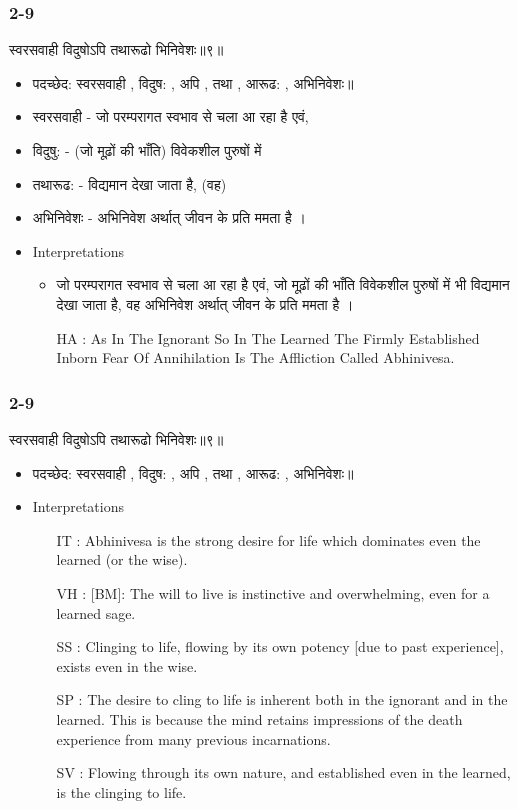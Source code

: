 \begin{frame}[fragile]\frametitle{2-9}
\begin{sanskrit}
स्वरसवाही विदुषोऽपि तथारूढो भिनिवेशः॥९॥
\end{sanskrit}

	\begin{itemize}
	\item पदच्छेद: स्वरसवाही , विदुष: , अपि , तथा , आरूढ: , अभिनिवेशः॥
	\item स्वरसवाही - जो परम्परागत स्वभाव से चला आ रहा है एवं,
	\item विदुषु: - (जो मूढ़ों की भाँति) विवेकशील पुरुषों में
	\item तथारूढ: - विद्यमान देखा जाता है, (वह)
	\item अभिनिवेशः - अभिनिवेश अर्थात् जीवन के प्रति ममता है ।	
	\item Interpretations
		\begin{itemize}
		\item जो परम्परागत स्वभाव से चला आ रहा है एवं, जो मूढ़ों की भाँति विवेकशील पुरुषों में भी विद्यमान देखा जाता है, वह अभिनिवेश अर्थात् जीवन के प्रति ममता है ।
		\item [HA]: As In The Ignorant So In The Learned The Firmly Established Inborn Fear Of Annihilation Is The Affliction Called Abhinivesa.
		\end{itemize}
	\end{itemize}

\end{frame}

\begin{frame}[fragile]\frametitle{2-9}
\begin{sanskrit}
स्वरसवाही विदुषोऽपि तथारूढो भिनिवेशः॥९॥
\end{sanskrit}

	\begin{itemize}
	\item पदच्छेद: स्वरसवाही , विदुष: , अपि , तथा , आरूढ: , अभिनिवेशः॥
	\item Interpretations
		\begin{itemize}
		\item [IT]: Abhinivesa is the strong desire for life which dominates even the learned (or the wise).
		\item [VH]: [BM]: The will to live is instinctive and overwhelming, even for a learned sage.
		\item [SS]: Clinging to life, flowing by its own potency [due to past experience], exists even in the wise.
		\item [SP]: The desire to cling to life is inherent both in the ignorant and in the learned. This is because the mind retains impressions of the death experience from many previous incarnations.
		\item [SV]: Flowing through its own nature, and established even in the learned, is the clinging to life. 
		\end{itemize}
	\end{itemize}

\end{frame}


